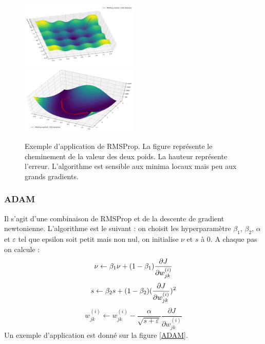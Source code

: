 \begin{figure}[!h]
\centering
\includegraphics[width=160pt]{"images/MLP/RMSProp"}
\hspace*{5mm}
\includegraphics[width=160pt]{"images/MLP/RMSPropPropre"}
\caption{Exemple d'application de RMSProp. La figure représente le cheminement de la valeur des deux poids. La hauteur représente l'erreur. L'algorithme est sensible aux minima locaux mais peu aux grands gradients.}
\label{RMSProp}
\end{figure}

\subsubsection{ADAM}
Il s'agit d'une combinaison de RMSProp et de la descente de gradient newtonienne.
L'algorithme est le suivant : on choisit les hyperparamètre $\beta_1$, $\beta_2$,  $\alpha$ et $\varepsilon$ tel que epsilon soit petit mais non nul, on initialise $\nu$ et $s$ à 0.
A chaque pas on calcule :
\begin{displaymath}
\nu \leftarrow \beta_1 \nu + (1-\beta_1) \frac{\partial J}{\partial w_{jk}^{(i)}} \\
\end{displaymath}
\begin{displaymath}
s \leftarrow \beta_2 s + (1-\beta_2) (\frac{\partial J}{\partial w_{jk}^{(i)}})^2 \\
\end{displaymath}
\begin{displaymath}
w_{jk}^{(i)} \leftarrow w_{jk}^{(i)} - \frac{\alpha}{\sqrt{s+\varepsilon}}\frac{\partial J}{\partial w_{jk}^{(i)}}
\end{displaymath}
Un exemple d'application est donné sur la figure \ref{ADAM}.

